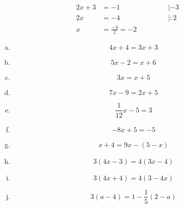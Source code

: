 \documentclass[a4paper,12pt]{article}
\begin{document}
{{\begin{align*}
					2x+3 &= -1\qquad\qquad\qquad &| -3\\
					2x &= -4\qquad\qquad\qquad &| : 2\\
					x&=\frac{-4}{2}= -2
				\end{align*}
	}
		\begin{enumerate}[(a)]
			\item \[4x+4=3x+3\]
			\item \[5x-2=x+6\]
			\item \[3x=x+5\]
			\item \[7x-9=2x+5\]
			\item \[\frac{1}{12}x-5=3\]
			\item \[-8x + 5 = -5\]
			\item \[x+4=9x-(5-x)\]
			\item \[3(4x-3)=4(3x-4)\]
			\item \[3(4x+4)=4(3-4x)\]
			\item \[3(a-4)=1-\frac{1}{5}(2-a)\]
		\end{enumerate}
}
\end{document}
